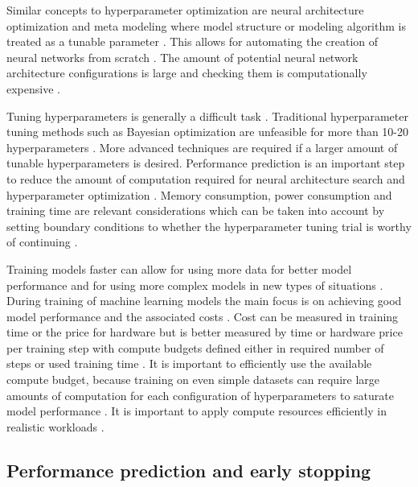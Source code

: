 Similar concepts to hyperparameter optimization are neural architecture optimization and meta modeling where model structure or modeling algorithm is treated as a tunable parameter \parencite{bakerAcceleratingNeuralArchitecture2017}. This allows for automating the creation of neural networks from scratch \parencite{bakerAcceleratingNeuralArchitecture2017}. The amount of potential neural network architecture configurations is large and checking them is computationally expensive \parencite{bakerAcceleratingNeuralArchitecture2017}.

Tuning hyperparameters is generally a difficult task \parencite{maclaurinGradientbasedHyperparameterOptimization2015}. Traditional hyperparameter tuning methods such as Bayesian optimization are unfeasible for more than 10-20 hyperparameters \parencite{maclaurinGradientbasedHyperparameterOptimization2015}.
More advanced techniques are required if a larger amount of tunable hyperparameters is desired.
Performance prediction is an important step to reduce the amount of computation required for neural architecture search and hyperparameter optimization \parencite{bakerAcceleratingNeuralArchitecture2017}.
Memory consumption, power consumption and training time are relevant considerations which can be taken into account by setting boundary conditions to whether the hyperparameter tuning trial is worthy of continuing \parencite{yuHyperParameterOptimizationReview2020}.

Training models faster can allow for using more data for better model performance and for using more complex models in new types of situations \parencite{shallueMeasuringEffectsData2019}. During training of machine learning models the main focus is on achieving good model performance and the associated costs \parencite{shallueMeasuringEffectsData2019}. Cost can be measured in training time or the price for hardware but is better measured by time or hardware price per training step with compute budgets defined either in required number of steps or used training time \parencite{shallueMeasuringEffectsData2019}. It is important to efficiently use the available compute budget, because training on even simple datasets can require large amounts of computation for each configuration of hyperparameters to saturate model performance \parencite{shallueMeasuringEffectsData2019}. It is important to apply compute resources efficiently in realistic workloads \parencite{shallueMeasuringEffectsData2019}.

\subsection{Performance prediction and early stopping}

